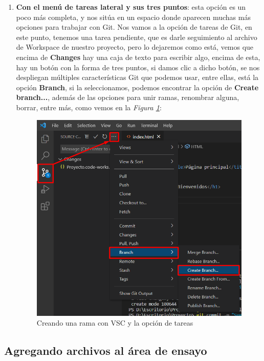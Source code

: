 \begin{enumerate}
    \item \textbf{Con el menú de tareas lateral y sus tres puntos}: esta opción es un poco más completa, y nos sitúa en un espacio donde aparecen muchas más opciones para trabajar con Git. Nos vamos a la opción de tareas de Git, en este punto, tenemos una tarea pendiente, que es darle seguimiento al archivo de Workspace de nuestro proyecto, pero lo dejaremos como está, vemos que encima de \textbf{Changes} hay una caja de texto para escribir algo, encima de esta, hay un botón con la forma de tres puntos, si damos clic a dicho botón, se nos despliegan múltiples características Git que podemos usar, entre ellas, está la opción \textbf{Branch}, si la seleccionamos, podemos encontrar la opción de \textbf{Create branch...}, además de las opciones para unir ramas, renombrar alguna, borrar, entre más, como vemos en la \textit{Figura \ref{fig: 19}}:
    \begin{figure}[H]
        \centering
        \caption{Creando una rama con VSC y la opción de tareas}
        \label{fig: 19}
        \includegraphics[width=\textwidth]{capturas/creando_b2.png}
    \end{figure}
\end{enumerate}


\subsection{Agregando archivos al área de ensayo}

